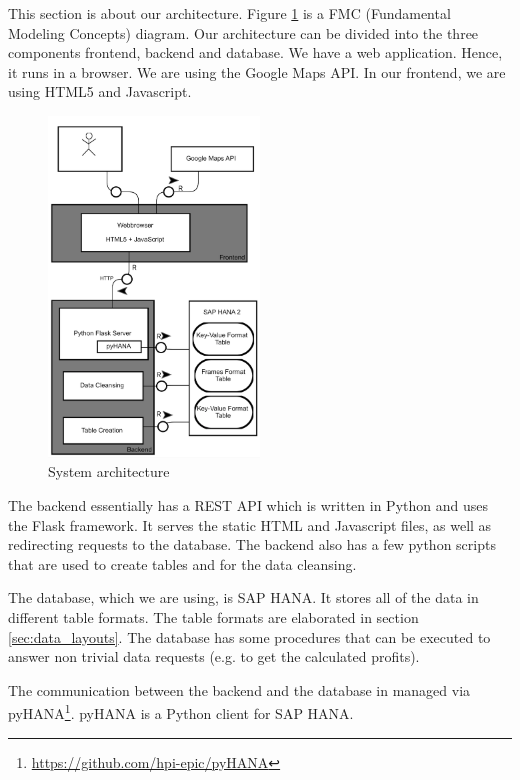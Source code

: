 \documentclass[10pt]{sig-alternate}
\begin{document}
This section is about our architecture. Figure \ref{fig:architecture} is a FMC (Fundamental Modeling Concepts) diagram. Our architecture can be divided into the three components frontend, backend and database. We have a web application. Hence, it runs in a browser. We are using the Google Maps API. In our frontend, we are using HTML5 and Javascript.\\

\begin{figure}[ht]
\centering
\includegraphics[width=0.5\textwidth]{img/architecture.png}
\caption{System architecture}
\label{fig:architecture}
\end{figure}

The backend essentially has a REST API which is written in Python and uses the Flask framework. It serves the static HTML and Javascript files, as well as redirecting requests to the database. The backend also has a few python scripts that are used to create tables and for the data cleansing.

The database, which we are using, is SAP HANA. It stores all of the data in different table formats. The table formats are elaborated in section \ref{sec:data_layouts}. The database has some procedures that can be executed to answer non trivial data requests (e.g. to get the calculated profits).

The communication between the backend and the database in managed via pyHANA\footnote{\href{https://github.com/hpi-epic/pyHANA}{https://github.com/hpi-epic/pyHANA}}. pyHANA is a Python client for SAP HANA.
\end{document}
